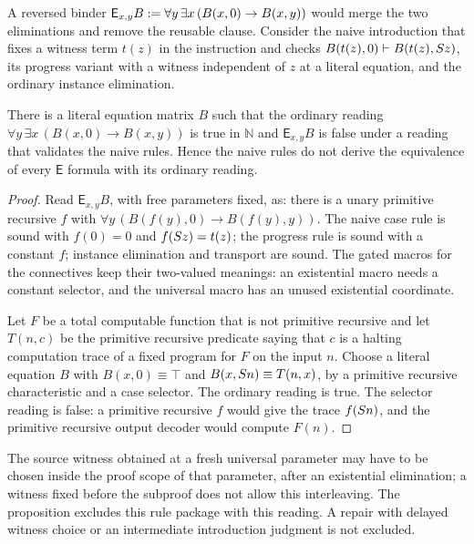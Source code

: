 A reversed binder
$\mathsf{E}_{x,y}B\mathrel{:=}\forall y\,\exists x\,(B(x,0)\to B(x,y))$ would merge
the two eliminations and remove the reusable clause. Consider the naive
introduction that fixes a witness term $t(z)$ in the instruction and checks
$B(t(z),0)\vdash B(t(z),S z)$, its progress variant with a witness
independent of $z$ at a literal equation, and the ordinary instance
elimination.

\begin{proposition}
\label{obs:prop:reversed}
There is a literal equation matrix $B$ such that the ordinary reading
$\forall y\,\exists x\,(B(x,0)\to B(x,y))$ is true in $\mathbb{N}$ and
$\mathsf{E}_{x,y}B$ is false under a reading that validates the naive rules.
Hence the naive rules do not derive the equivalence of every $\mathsf{E}$
formula with its ordinary reading.
\end{proposition}

\begin{proof}
Read $\mathsf{E}_{x,y}B$, with free parameters fixed, as: there is a unary
primitive recursive $f$ with $\forall y\,(B(f(y),0)\to B(f(y),y))$. The naive
case rule is sound with $f(0)=0$ and $f(S z)=t(z)$; the progress rule is
sound with a constant $f$; instance elimination and transport are sound. The
gated macros for the connectives keep their two-valued meanings: an existential
macro needs a constant selector, and the universal macro has an unused
existential coordinate.

Let $F$ be a total computable function that is not primitive recursive and let
$T(n,c)$ be the primitive recursive predicate saying that $c$ is a halting
computation trace of a fixed program for $F$ on the input $n$. Choose a literal
equation $B$ with $B(x,0)\equiv\top$ and $B(x,S n)\equiv T(n,x)$, by a
primitive recursive characteristic and a case selector. The ordinary reading is
true. The selector reading is false: a primitive recursive $f$ would give the
trace $f(S n)$, and the primitive recursive output decoder would compute
$F(n)$.
\end{proof}

The source witness obtained at a fresh universal parameter may have to be
chosen inside the proof scope of that parameter, after an existential
elimination; a witness fixed before the subproof does not allow this
interleaving. The proposition excludes this rule package with this reading. A
repair with delayed witness choice or an intermediate introduction judgment is
not excluded.

